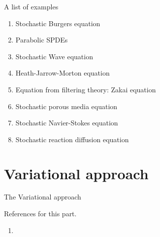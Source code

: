 \begin{frame}
    {A list of examples}
    
    \begin{enumerate}
        \item Stochastic Burgers equation 
        \item Parabolic SPDEs
        \item Stochastic Wave equation
        \item Heath-Jarrow-Morton equation
        \item Equation from filtering theory: Zakai equation
        \item Stochastic porous media equation
        \item Stochastic Navier-Stokes equation
        \item Stochastic reaction diffusion equation
    \end{enumerate}


\end{frame}



\section{Variational approach}

\begin{frame}
    
    {\LARGE{The Variational approach}}
    \vfill

    References for this part. 
    \begin{enumerate}
        \item \cite{prevot2007concise}
    \end{enumerate}
\end{frame}



